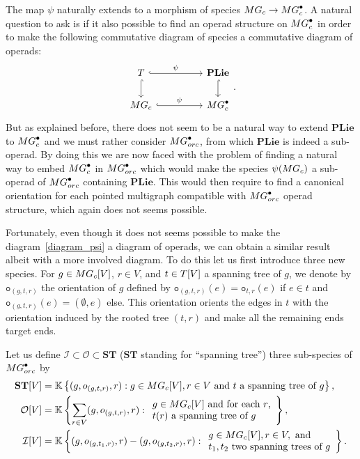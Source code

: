 \documentclass[11pt]{article}
\theoremstyle{definition}
\numberwithin{equation}{section}
\newcommand{\spe}[1]{\normalfont{\textsc{#1}}}
\newcommand{\op}[1]{\mathbf{#1}}
\newcommand{\K}{\mathbb{K}}
\newcommand{\point}[1]{#1^{\bullet}}
\newcommand{\ori}{\texttt{o}}
\newcommand{\T}{\spe{T}}
\newcommand{\MG}{\spe{MG}}
\newcommand{\Operad}{\mathcal{O}}
\newcommand{\PLie}{\op{PLie}}
\newcommand{\ST}{\op{ST}}
\begin{document}
The map $\psi$ naturally extends to a morphism of species $\MG_c\to \point{\MG}_c$. A natural question to 
ask is if it also possible to find an operad structure on $\point{\MG}_c$ in order to make the following 
commutative diagram of species a commutative diagram of operads:
\begin{equation}\label{diagram_psi}
    \begin{tikzcd}[column sep=huge, ampersand replacement=\&]
        \T \arrow[r, hook, "\psi"] \arrow[d, hook] \& \PLie \arrow[d, hook] \\
        \MG_c \arrow[r, hook, "\psi"] \& \point{\MG}_c
    \end{tikzcd}.
\end{equation}
But as explained before, there does not seem to be a natural way to extend $\PLie$ to $\point{\MG}_c$ and we 
must rather consider $\point{\MG}_{orc}$, from which $\PLie$ is indeed a sub-operad. By doing this we are now 
faced with the problem of finding a natural way to embed $\point{\MG}_c$ in $\point{\MG}_{orc}$ which would 
make the species $\psi(\MG_c)$ a sub-operad of $\point{\MG}_{orc}$ containing $\PLie$. This would then require 
to find a canonical orientation for each pointed multigraph compatible with $\point{\MG}_{orc}$ operad 
structure, which again does not seems possible.

Fortunately, even though it does not seems possible to make the diagram~\eqref{diagram_psi} a diagram of 
operads, we can obtain a similar result albeit with a more involved diagram. To do this let us first introduce 
three new species. 
For $g\in \MG_c[V]$, $r\in V$, and $t\in \T[V]$ a spanning tree of $g$, we denote by $\ori_{(g,t,r)}$ the 
orientation of $g$ defined by $\ori_{(g,t,r)}(e) = \ori_{t,r}(e)$ if $e\in t$ and $\ori_{(g,t,r)}(e) = (\emptyset, e)$ else. 
This orientation orients the edges in $t$ with the orientation induced by the rooted tree $(t,r)$ and make all the 
remaining ends target ends.

Let us define $\mathcal{I}\subset \Operad\subset\ST$ ($\ST$ standing for ``spanning tree'') three sub-species 
of $\point{\MG_{orc}}$ by
\begin{align}
    \ST[V] &= \K\left\{
        (g, \ori_{(g,t,r)},r) : g\in \MG_c[V], r\in V \text{ and $t$ a
    spanning tree of $g$}\right\}, \\
    \Operad[V] &= \K\left\{\sum_{r\in V} (g, \ori_{(g,t,r)},r) : 
    \begin{array}{l}
    g\in \MG_c[V] \text{ and for each $r$,} \\ 
    \text{$t(r)$ a spanning tree of $g$}
    \end{array}\right\}, \\
    \mathcal{I}[V] &=
    \K\left\{ (g, \ori_{(g,t_1,r)},r)-(g, \ori_{(g,t_2,r)},r) : 
    \begin{array}{l}
    g \in \MG_c[V],r\in V, \text{ and } \\
    \text{$t_1, t_2$ two spanning trees of $g$}
    \end{array}\right\}.
\end{align}
\end{document}
